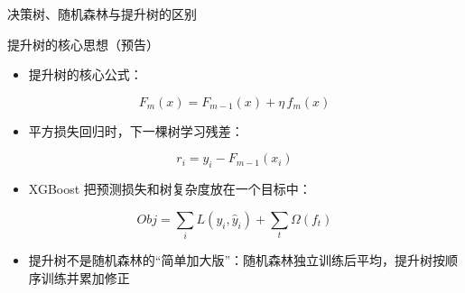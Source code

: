 \documentclass[10pt,aspectratio=43]{beamer}
\begin{document}
\begin{frame}{决策树、随机森林与提升树的区别}
  \vspace{-1ex}
  \begin{center}
  \end{center}
\end{frame}

\begin{frame}{提升树的核心思想（预告）}
  \begin{itemize}
    \item 提升树的核心公式：
  \end{itemize}
  \[
    F_m(x)=F_{m-1}(x)+\eta\, f_m(x)
  \]
  \begin{itemize}
    \item 平方损失回归时，下一棵树学习残差：
  \end{itemize}
  \[
    r_i=y_i-F_{m-1}(x_i)
  \]
  \begin{itemize}
    \item XGBoost 把预测损失和树复杂度放在一个目标中：
  \end{itemize}
  \[
    Obj=\sum_i L\left(y_i,\hat{y}_i\right)+\sum_t \Omega\left(f_t\right)
  \]
  \begin{itemize}
    \item 提升树不是随机森林的“简单加大版”：随机森林独立训练后平均，提升树按顺序训练并累加修正
  \end{itemize}
\end{frame}
\end{document}
